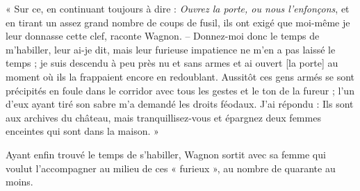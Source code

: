 \documentclass[french,twoside]{book} %
\newenvironment{quoteblock}%
  {\begin{quoting}}
  {\end{quoting}}
\newenvironment{quotebar}{%
    \def\FrameCommand{{\color{rubric!10!}\vrule width 0.5em} \hspace{0.9em}}%
    \def\OuterFrameSep{\itemsep} %
    \MakeFramed {\advance\hsize-\width \FrameRestore}
  }%
  {%
    \endMakeFramed
  }
\renewenvironment{quoteblock}%
  {%
    \savenotes
    \setstretch{0.9}
    \begin{quotebar}
  }
  {%
    \end{quotebar}
    \spewnotes
  }
\begin{document}
\begin{quoteblock}
 \noindent « Sur ce, en continuant toujours à dire : \emph{Ouvrez la porte, ou nous l’enfonçons}, et en tirant un assez grand nombre de coups de fusil, ils ont exigé que moi-même je leur donnasse cette clef, raconte Wagnon. – Donnez-moi donc le temps de m’habiller, leur ai-je dit, mais leur furieuse impatience ne m’en a pas laissé le temps ; je suis descendu à peu près nu et sans armes et ai ouvert [la porte] au moment où ils la frappaient encore en redoublant. Aussitôt ces gens armés se sont précipités en foule dans le corridor avec tous les gestes et le ton de la fureur ; l’un d’eux ayant tiré son sabre m’a demandé les droits féodaux. J’ai répondu : Ils sont aux archives du château, mais tranquillisez-vous et épargnez deux femmes enceintes qui sont dans la maison. »
 \end{quoteblock}

\noindent Ayant enfin trouvé le temps de s’habiller, Wagnon sortit avec sa femme qui voulut l’accompagner au milieu de ces « furieux », au nombre de quarante au moins.\par
\end{document}
